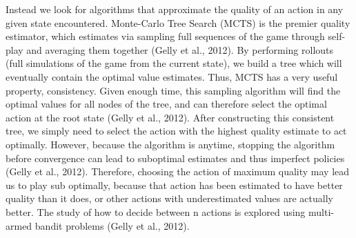 \documentclass[a4paper,12pt]{proposal}
\begin{document}
Instead we look for algorithms that approximate the quality of an action in any given state encountered. Monte-Carlo Tree Search (MCTS) is the premier quality estimator, which estimates via sampling full sequences of the game through self-play and averaging them together (Gelly et al., 2012). By performing rollouts (full simulations of the game from the current state), we build a tree which will eventually contain the optimal value estimates. Thus, MCTS has a very useful property, consistency. Given enough time, this sampling algorithm will find the optimal values for all nodes of the tree, and can therefore select the optimal action at the root state (Gelly et al., 2012). After constructing this consistent tree, we simply need to select the action with the highest quality estimate to act optimally. However, because the algorithm is anytime, stopping the algorithm before convergence can lead to suboptimal estimates and thus imperfect policies (Gelly et al., 2012). Therefore, choosing the action of maximum quality may lead us to play sub optimally, because that action has been estimated to have better quality than it does, or other actions with underestimated values are actually better. The study of how to decide between n actions is explored using multi-armed bandit problems (Gelly et al., 2012). 
\end{document}
